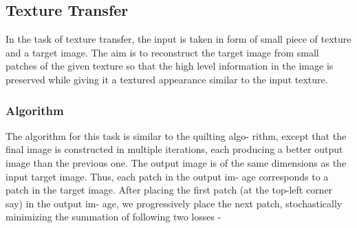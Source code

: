 \documentclass[10pt,twocolumn,letterpaper]{article}
\begin{document}
\subsection{Texture Transfer}
In the task of texture transfer, the input is taken in form
of small piece of texture and a target image. The aim is to
reconstruct the target image from small patches of the given
texture so that the high level information in the image is
preserved while giving it a textured appearance similar to
the input texture.

\subsubsection{Algorithm}
The algorithm for this task is similar to the quilting algo-
rithm, except that the final image is constructed in multiple
iterations, each producing a better output image than the
previous one. The output image is of the same dimensions
as the input target image. Thus, each patch in the output im-
age corresponds to a patch in the target image. After placing
the first patch (at the top-left corner say) in the output im-
age, we progressively place the next patch, stochastically
minimizing the summation of following two losses -
\end{document}
